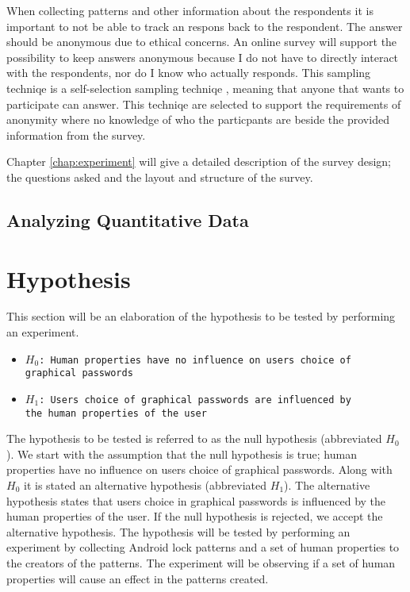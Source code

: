 			When collecting patterns and other information about the respondents it is important to not be able to track an respons back to the respondent. The answer should be anonymous due to ethical concerns. An online survey will support the possibility to keep answers anonymous because I do not have to directly interact with the respondents, nor do I know who actually responds. This sampling techniqe is a self-selection sampling techniqe \cite{empiriske}, meaning that anyone that wants to participate can answer. This techniqe are selected to support the requirements of anonymity where no knowledge of who the particpants are beside the provided information from the survey. 

			Chapter \ref{chap:experiment} will give a detailed description of the survey design; the questions asked and the layout and structure of the survey.


		\subsection{Analyzing Quantitative Data}

	\clearpage
	\section{Hypothesis}\label{sec:hypothesis}

		This section will be an elaboration of the hypothesis to be tested by performing an experiment.

		{\renewcommand\labelitemi{}
			\begin{itemize}
	  		\item \texttt{$H_{0}$: Human properties have no influence on users choice of \\graphical passwords}
	  		\item \texttt{$H_{1}$: Users choice of graphical passwords are influenced by \\the human properties of the user}
	  	\end{itemize}
	  }

	  The hypothesis to be tested is referred to as the null hypothesis (abbreviated $H_{0}$). We start with the assumption that the null hypothesis is true; human properties have no influence on users choice of graphical passwords. Along with $H_{0}$ it is stated an alternative hypothesis (abbreviated $H_{1}$). The alternative hypothesis states that users choice in graphical passwords is influenced by the human properties of the user. If the null hypothesis is rejected, we accept the alternative hypothesis. The hypothesis will be tested by performing an experiment by collecting Android lock patterns and a set of human properties to the creators of the patterns. The experiment will be observing if a set of human properties will cause an effect in the patterns created.

